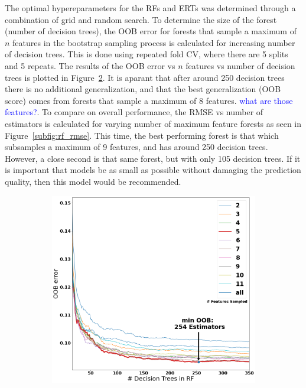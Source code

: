 \documentclass[a4paper, twoside, final, 12pt]{article}
\begin{document}
{The optimal hypereparameters for the RFs and ERTs was determined through a combination of grid and random search. 
To determine the size of the forest (number of decision trees), the OOB error for forests that sample a maximum of $n$ features in the bootstrap sampling process is calculated for increasing number of decision trees.
This is done using repeated fold CV, where there are 5 splits and 5 repeats.
The results of the OOB error vs $n$ features vs number of decision trees is plotted in Figure~\ref{subfig:rfoob}.
It is aparant that after around 250 decision trees there is no additional generalization, and that the best generalization (OOB score) comes from forests that sample a maximum of 8 features.
\textcolor{blue}{what are those features?}.
To compare on overall performance, the RMSE vs number of estimators is calculated for varying number of maximum feature forests as seen in Figure~\ref{subfig:rf_rmse}.
This time, the best performing forest is that which subsamples a maximum of 9 features, and has around 250 decision trees.
However, a close second is that same forest, but with only 105 decision trees.
If it is important that models be as small as possible without damaging the prediction quality, then this model would be recommended.
\begin{figure}
	\begin{subfigure}{0.48\linewidth}
		\centering
		\includegraphics[scale=0.2]{./src/RF_oob_error}
		\caption{}
		\label{subfig:rfoob}

\end{subfigure}
\end{figure}}
\end{document}
